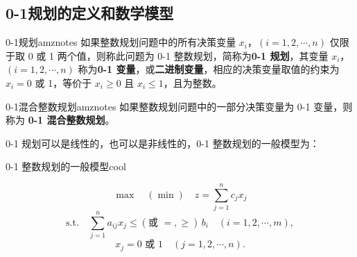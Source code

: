     \subsection{0-1规划的定义和数学模型}
    \begin{dfnbox}{0-1规划}{amznotes}
        如果整数规划问题中的所有决策变量 $x_i$，$(i=1, 2, \cdots, n)$ 仅限于取 0 或 1 两个值，则称此问题为 0-1 整数规划，简称为\textbf{0-1 规划}，其变量 $x_i$，$(i=1, 2, \cdots, n)$ 称为\textbf{0-1 变量}，或\textbf{二进制变量}，相应的决策变量取值的约束为 $x_i = 0$ 或 1，等价于 $x_i \geq 0$ 且 $x_i \leq 1$，且为整数。
    \end{dfnbox}
    \begin{dfnbox}{0-1混合整数规划}{amznotes}
        如果整数规划问题中的一部分决策变量为 0-1 变量，则称为 \textbf{0-1 混合整数规划}。
    \end{dfnbox}
    0-1 规划可以是线性的，也可以是非线性的，0-1 整数规划的一般模型为：
    \begin{thmbox}{0-1 整数规划的一般模型}{cool}
        \begin{center}
            \begin{equation*}
            \max \quad (\min) \quad z = \sum_{j=1}^n c_j x_j
            \end{equation*}
            \begin{equation*}
            \text{s.t.} \quad \sum_{j=1}^n a_{ij} x_j \leq (\text{或 } =, \geq) \, b_i \quad (i=1, 2, \cdots, m),
            \end{equation*}
            \begin{equation*}
            x_j = 0 \text{ 或 } 1 \quad (j=1, 2, \cdots, n).
            \end{equation*}
            \end{center}
    \end{thmbox}

